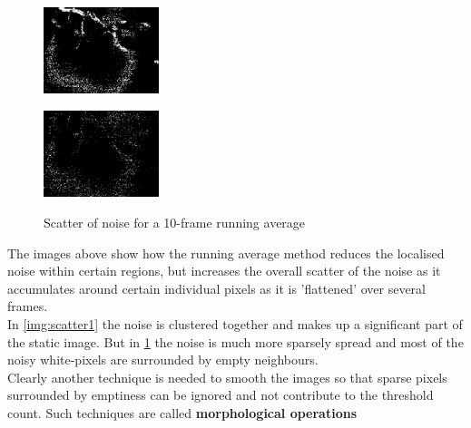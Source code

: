 \documentclass[11pt]{article} %
\begin{document}
\begin{figure}
	\vspace{-20pt}
	\begin{center}
		\includegraphics[width=0.3\textwidth]{../images/scatter1}
		\label{img:scatter1}
	\end{center}
	\vspace{-20pt}
	\caption{Scatter of noise for a 1-frame running average}
	\vspace{10pt}
	\begin{center}
		\includegraphics[width=0.3\textwidth]{../images/scatter2}
		\label{img:scatter2}
	\end{center}
	\vspace{-20pt}
	\caption{Scatter of noise for a 10-frame running average}
\end{figure}
The images above show how the running average method reduces the localised noise within certain regions, but increases the overall scatter of the noise as it accumulates around certain individual pixels as it is 'flattened' over several frames.\\
In \cref{img:scatter1} the noise is clustered together and makes up a significant part of the static image. But in \cref{img:scatter2} the noise is much more sparsely spread and most of the noisy white-pixels are surrounded by empty neighbours.\\

Clearly another technique is needed to smooth the images so that sparse pixels surrounded by emptiness can be ignored and not contribute to the threshold count. Such techniques are called \bf{morphological operations}
\end{document}
